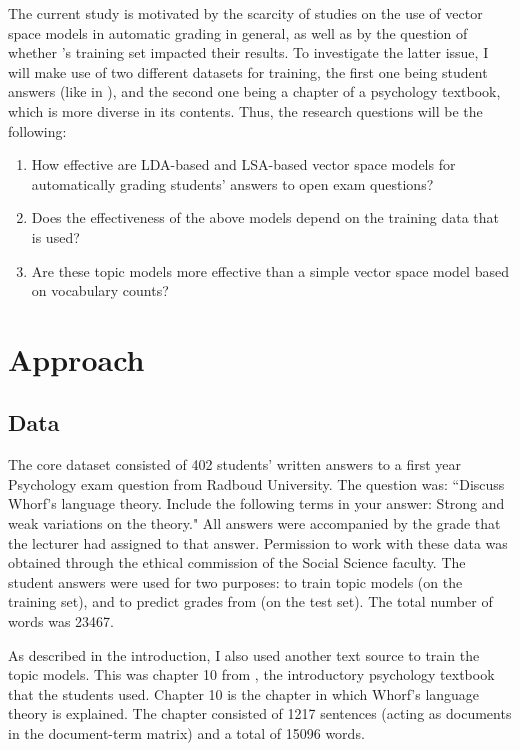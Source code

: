 \documentclass[a4paper,10pt,twoside]{article}
\begin{document}
The current study is motivated by the scarcity of studies on the use of vector space models in automatic grading in general, as well as by the question of whether 's training set impacted their results. To investigate the latter issue, I will make use of two different datasets for training, the first one being student answers (like in ), and the second one being a chapter of a psychology textbook, which is more diverse in its contents. Thus, the research questions will be the following:

\begin{enumerate}
\item How effective are LDA-based and LSA-based vector space models for automatically grading students' answers to open exam questions?
\item Does the effectiveness of the above models depend on the training data that is used?
\item Are these topic models more effective than a simple vector space model based on vocabulary counts?
\end{enumerate}

\section{Approach}

\subsection{Data}
The core dataset consisted of 402 students' written answers to a first year Psychology exam question from Radboud University. The question was: ``Discuss Whorf's language theory. Include the following terms in your answer: Strong and weak variations on the theory." All answers were accompanied by the grade that the lecturer had assigned to that answer. Permission to work with these data was obtained through the ethical commission of the Social Science faculty. The student answers were used for two purposes: to train topic models (on the training set), and to predict grades from (on the test set). The total number of words was 23467.

As described in the introduction, I also used another text source to train the topic models. This was chapter 10 from , the introductory psychology textbook that the students used. Chapter 10 is the chapter in which Whorf's language theory is explained. The chapter consisted of 1217 sentences (acting as documents in the document-term matrix) and a total of 15096 words.
\end{document}
